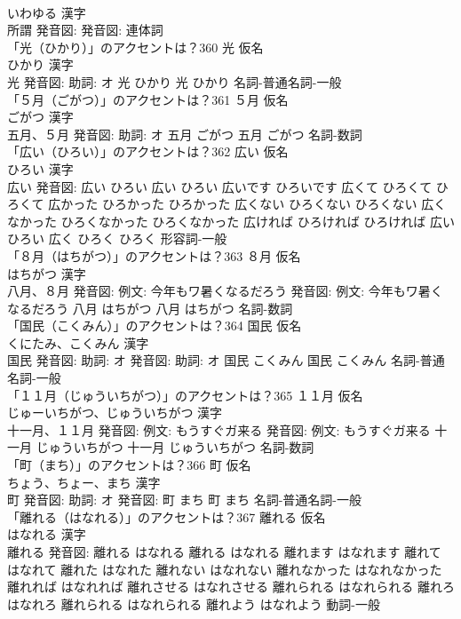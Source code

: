 \documentclass[8pt]{extreport}
\begin{document}
\begin{CJK}{UTF8}{min}
\\	いわゆる 漢字　
\\	所謂 発音図: 発音図:							連体詞 
\\	「光（ひかり）」のアクセントは？360	光 仮名　
\\	ひかり 漢字　
\\	光 発音図: 助詞: オ	光 ひかり		光 ひかり				名詞-普通名詞-一般 
\\	「５月（ごがつ）」のアクセントは？361	５月 仮名　
\\	ごがつ 漢字　
\\	五月、５月 発音図: 助詞: オ	五月 ごがつ		五月 ごがつ				名詞-数詞 
\\	「広い（ひろい）」のアクセントは？362	広い 仮名　
\\	ひろい 漢字　
\\	広い 発音図:	広い ひろい		広い ひろい 広いです ひろいです 広くて ひろくて ひろくて 広かった ひろかった ひろかった 広くない ひろくない ひろくない 広くなかった ひろくなかった ひろくなかった 広ければ ひろければ ひろければ 広い ひろい 広く ひろく ひろく				形容詞-一般 
\\	「８月（はちがつ）」のアクセントは？363	８月 仮名　
\\	はちがつ 漢字　
\\	八月、８月 発音図: 例文: 今年もワ暑くなるだろう 発音図: 例文: 今年もワ暑くなるだろう	八月 はちがつ		八月 はちがつ				名詞-数詞 
\\	「国民（こくみん）」のアクセントは？364	国民 仮名　
\\	くにたみ、こくみん 漢字　
\\	国民 発音図: 助詞: オ 発音図: 助詞: オ	国民 こくみん		国民 こくみん				名詞-普通名詞-一般 
\\	「１１月（じゅういちがつ）」のアクセントは？365	１１月 仮名　
\\	じゅーいちがつ、じゅういちがつ 漢字　
\\	十一月、１１月 発音図: 例文: もうすぐガ来る 発音図: 例文: もうすぐガ来る	十一月 じゅういちがつ		十一月 じゅういちがつ				名詞-数詞 
\\	「町（まち）」のアクセントは？366	町 仮名　
\\	ちょう、ちょー、まち 漢字　
\\	町 発音図: 助詞: オ 発音図:	町 まち		町 まち				名詞-普通名詞-一般 
\\	「離れる（はなれる）」のアクセントは？367	離れる 仮名　
\\	はなれる 漢字　
\\	離れる 発音図:	離れる はなれる		離れる はなれる 離れます はなれます 離れて はなれて 離れた はなれた 離れない はなれない 離れなかった はなれなかった 離れれば はなれれば 離れさせる はなれさせる 離れられる はなれられる 離れろ はなれろ 離れられる はなれられる 離れよう はなれよう				動詞-一般 

\end{CJK}
\end{document}
